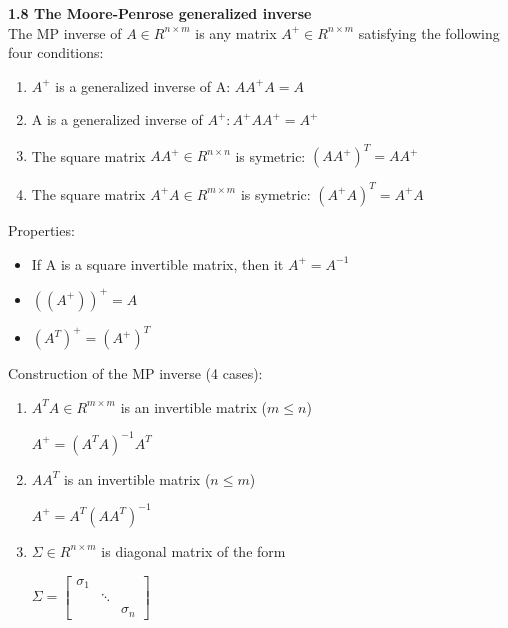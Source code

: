 \documentclass{article}
\begin{document}
\begin{multicols}{3}
\textbf{1.8 The Moore-Penrose generalized inverse}\\
The MP inverse of $A \in R^{n \times m}$ is any matrix 
$A^+ \in R^{n \times m}$ satisfying the following four conditions:
\begin{enumerate}
    \item $A^+$ is a generalized inverse of A: $AA^+A = A$
    \item A is a generalized inverse of $A^+: A^+AA^+ = A^+$
    \item The square matrix $AA^+ \in R^{n \times n}$ is symetric: $(AA^+)^T = AA^+$
    \item The square matrix $A^+A \in R^{m \times m}$ is symetric: $(A^+A)^T = A^+A$
\end{enumerate}
Properties:
\begin{itemize}
    \item If A is a square invertible matrix, then it $A^+ = A^{-1}$
    \item $((A^+))^+ = A$
    \item $(A^T)^+ = (A^+)^T$
\end{itemize}
Construction of the MP inverse (4 cases):
\begin{enumerate}
    \item $A^TA \in R^{m \times m}$ is an invertible matrix ($m \leq n$)
        \begin{center}
            \begin{math}
                A^+ = (A^TA)^{-1}A^T
            \end{math}
        \end{center}
    \item $AA^T$ is an invertible matrix ($n \leq m$)
        \begin{center}
            \begin{math}
                A^+ = A^T(AA^T)^{-1} 
            \end{math}
        \end{center}
    \item $\Sigma \in R^{n \times m}$ is diagonal matrix of the form
        \begin{center}
            \begin{math}
                \Sigma =
                \begin{bmatrix}
                    \sigma_1 &        & \\
                             & \ddots & \\
                             &        & \sigma_n
                \end{bmatrix}

\end{math}
\end{center}
\end{enumerate}
\end{multicols}
\end{document}
